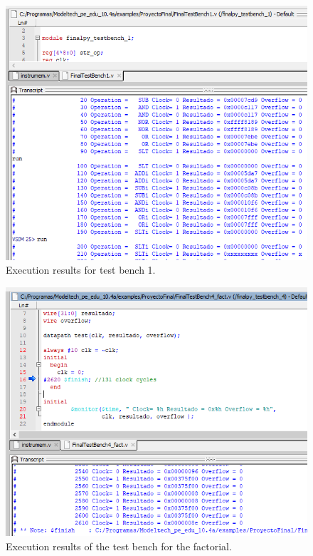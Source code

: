 \documentclass[conference]{IEEEtran}
\begin{document}
\begin{figure}[h]
\includegraphics[scale=0.41]{ModelSim_testbench1_clock_cycles.png}
\caption{Execution results for test bench 1.}
\label{result1}
\end{figure}

\begin{figure}[h]
\includegraphics[scale=0.5]{ModelSim_factorial4_clock_cycles.png}
\caption{Execution results of the test bench for the factorial.}
\label{result_factorial}
\end{figure}
\end{document}
